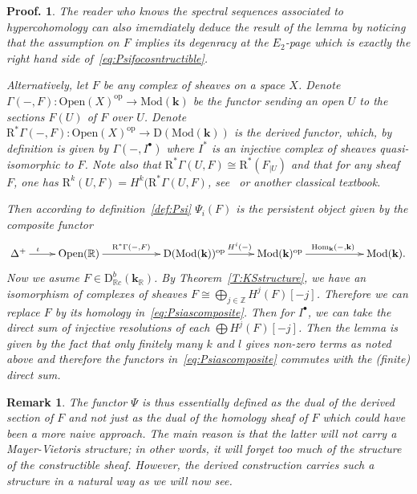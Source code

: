 \documentclass[a4paper, english, 11pt]{article}
\newcommand{\kk}[0]{\textbf{k}}
\newcommand{\Mod}[0]{\text{Mod}}
\newcommand{\0}{\vec{0}}
\newcommand{\R}[0]{\mathbb{R}}
\newcommand{\Z}[0]{\mathbb{Z}}
\newcommand{\D}[0]{\text{D}}
\newcommand{\Ouv}[0]{\mathrm{Open}}
\newcommand{\op}[0]{\text{op}}
\newcommand{\Hom}[0]{\text{Hom}}
\newcommand{\Rr}[0]{\text{R}}
\newtheorem*{pf}{Proof.} }
\newtheorem{remark}[prop]{Remark}
\begin{document}
  \begin{pf}
  The reader who knows the spectral sequences associated to hypercohomology can also imemdiately deduce the result of the lemma by noticing that the assumption on $F$ implies its degenracy at the $E_2$-page which is exactly the right hand side of~\eqref{eq:Psifocosntructible}.
   
   \smallskip
   
   Alternatively, let $F$ be any complex of sheaves on a space $X$. Denote $\Gamma(-,F): \Ouv(X)^{\op}\to \Mod(\kk)$ be the functor sending an open $U$ to the sections $F(U)$ of $F$ over $U$. Denote 
   $\Rr^*\Gamma(-,F): \Ouv(X)^{\op}\to \D(\Mod(\kk))$ is the derived functor, which, by definition is given by $\Gamma(-, I^\bullet)$ where $I^*$ is an injective complex of sheaves quasi-isomorphic to $F$.  Note also that 
   $\Rr^* \Gamma(U, F) \cong \Rr^*(F_{|U})$ and that for any sheaf $F$, one has $\Rr^k(U,F)= H^k(\Rr^*\Gamma(U,F)$, see~\cite{Kash90} or another classical textbook.
   
   Then according to definition~\ref{def:Psi} $\Psi_i(F)$ is the persistent object given by the composite functor
  \begin{equation}\label{eq:Psiascomposite}\xymatrix{\Delta^+ \ar[r]^{\iota\qquad} &\Ouv(\R) \ar[rr]^{\Rr^*\Gamma(-,F)\quad } && \D(\Mod(\kk))^{\op} \ar[r]^{\;\;H^i(-)} & \Mod(\kk)^{\op} \ar[rr]^{\Hom_{\kk}( - , \kk)} && \Mod(\kk).}\end{equation}
  Now we asume $F \in \D^b_{\R c}(\kk_\R)$. By Theorem~\ref{T:KSstructure}, we have an isomorphism of complexes of sheaves 
  $F \cong \bigoplus_{j\in \Z} H^j(F)[-j]$. Therefore we can replace $F$ by its homology in~\eqref{eq:Psiascomposite}. Then  for $I^\bullet$, we can take the direct sum of injective resolutions of each $\bigoplus H^j(F)[-j]$. Then the lemma is given by the fact that only finitely many $k$ and $l$ gives non-zero terms as noted above and therefore the functors in~\eqref{eq:Psiascomposite} commutes with the (finite) direct sum.
  \end{pf}

\begin{remark}
 The functor $\Psi$ is thus essentially defined as  the dual of the derived section of $F$ and not just as the dual of the homology sheaf of $F$ which could have been a more naive approach. The main reason is that the latter will not carry a Mayer-Vietoris structure; in other words, it will forget too much of the structure of the constructible sheaf. However, the derived construction carries such a structure in a natural way as we will now see.
\end{remark}
\end{document}
